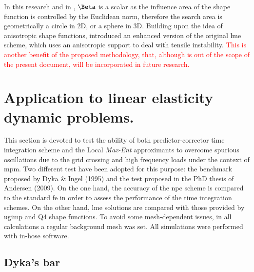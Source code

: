 \documentclass[preprint,12pt,a4paper]{elsarticle}
\newcommand{\PNA}[1]{
  \textcolor{red}{{#1}}
}
\begin{document}
In this research and in \cite{Arroyo2006}, $\Beta$ is a scalar as the
influence area of the shape function is controlled by the Euclidean
norm, therefore the search area is geometrically a circle in 2D, or a
sphere in 3D. Building upon the idea of anisotropic shape functions,
\cite{Kochmann2019} introduced an enhanced version of the original
\acrshort{lme} scheme, which uses an anisotropic support to deal with 
tensile instability. \PNA{This is another benefit of the proposed methodology, that, although is out of the scope of the
present document, will be incorporated in future research.}

\section{Application to linear elasticity dynamic problems.}
\label{sec:Application-linear-elasticity-dynamic-problems}

This section is devoted to test the ability of both predictor-corrector
time integration scheme and the Local \textit{Max-Ent} approximants to
overcome spurious oscillations due to the grid crossing and high
frequency loads under the context of \acrshort{mpm}. Two different test have
been adopted for this purpose: the benchmark proposed by Dyka \& Ingel
(1995)\cite{Dyka1995} and the test proposed in the PhD thesis of
Andersen (2009)\cite{thesis_Andersen_2009}. On the one hand, the accuracy of the \acrfull{npc}
scheme is compared to the standard \acrfull{fe} in order to assess the performance of the time integration schemes. On the other hand,  \acrshort{lme} solutions
are compared with those provided by \acrfull{ugimp} and Q4 shape
functions. To avoid some mesh-dependent issues, in all
calculations a regular background mesh was set. All simulations were performed with in-hose software.

\subsection{Dyka's bar \cite{Dyka1995}}
\label{sec:dyka-bar}
\end{document}
